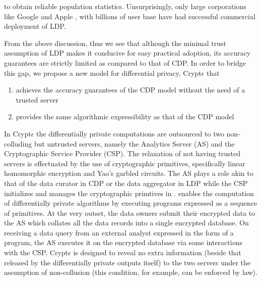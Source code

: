 to obtain reliable population statistics. Unsurprisingly, only large corporations  like Google \cite{Rappor1,Rappor2,Prochlo} and Apple \cite{Apple}, with  billions of user base have had successful commercial deployment of \textsf{LDP}. %
\par From the above discussion, thus we see that although the minimal trust assumption of \textsf{LDP} makes it conducive for easy practical adoption, its accuracy guarantees are strictly limited as compared to that of \textsf{CDP}. In order to bridge this gap, we propose a new model for differential privacy, Crypt$\epsilon$ that  \begin{enumerate}\item achieves the accuracy guarantees of the \textsf{CDP} model without the need of a trusted server \item provides the same algorithmic expressibility as that of the \textsf{CDP} model \end{enumerate} 
In Crypt$\epsilon$ the differentially private computations are outsourced to two non-colluding but untrusted servers, namely the Analytics Server (\textsf{AS}) and the Cryptographic Service Provider (\textsf{CSP}). The relaxation of not having trusted servers is effectuated by the use of cryptographic primitives, specifically linear homomorphic encryption and Yao's garbled circuits. The \textsf{AS} plays a role akin to that of the data curator in \textsf{CDP} or the data aggregator in \textsf{LDP} while the \textsf{CSP} initializes and manages the cryptographic primtives in \system. \system enables the computation of differentially private algorithms by executing programs expressed as a sequence of \system primitives. At the very outset, the data owners submit their encrypted data to the \textsf{AS} which collates all the data records into a single encrypted database.  On receiving a data query from an external analyst expressed in the form of a \system program, the \textsf{AS} executes it on the encrypted database via some interactions with the \textsf{CSP}.  Crypt$\epsilon$ is designed to reveal no extra information (beside that released by the differentially private outputs itself) to
the two servers under the assumption of  non-collusion (this condition, for example, can be enforced by law). 
